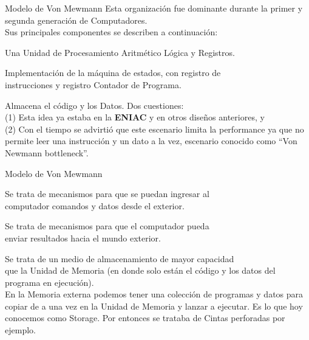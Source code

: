 \documentclass[table,dvipsnames,aspectratio=169]{beamer}
\begin{document}
\begin{frame}{Modelo de Von Mewmann}
  \small
  Esta organización fue dominante durante la primer y segunda generación de Computadores.\\
  Sus principales componentes se describen a continuación:
  \begin{description} \justifying \parskip 0.4cm
   \item [\textbf{\textit{Central Arithmetic (CA)}}:] Una Unidad de Procesamiento Aritmético Lógica y Registros.
   \item [\textbf{\textit{Central Control (CC)}}:] Implementación de la máquina de estados, con registro de\\
                                                   instrucciones y registro  Contador de Programa.
   \item [\textbf{\textit{Memory (M)}}:] Almacena el código y los Datos. Dos cuestiones:\\
   (1) Esta idea ya estaba en la \textbf{ENIAC} y en otros diseños anteriores, y\\
   (2) Con el tiempo se advirtió que este escenario limita la performance ya que no permite leer una instrucción y un dato a la vez, escenario conocido como ``Von Newmann bottleneck''.
  \end{description}
\end{frame}

\begin{frame}{Modelo de Von Mewmann}
  \begin{description}\justifying \parskip 0.4cm
   \item [\textbf{\textit{Entrada (I)}}:] Se trata de mecanismos para que se puedan ingresar al\\
                                          computador comandos y datos desde el exterior.
   \item [\textbf{\textit{Salida (O)}}:] Se trata de mecanismos para que el computador pueda\\
                                         enviar resultados hacia el mundo exterior.
   \item [\textit{\textbf{Memoria Externa (R)}}:] Se trata de un medio de almacenamiento de mayor capacidad\\
                                                  que la Unidad de Memoria {\small (en donde solo están el código y los datos del programa en ejecución)}.\\
                                                  En la Memoria externa podemos tener una colección de programas y datos para copiar de a una vez en la Unidad de Memoria y lanzar a ejecutar. Es lo que hoy conocemos como Storage. Por entonces se trataba de Cintas perforadas por ejemplo.
  \end{description}
\end{frame}
\end{document}
